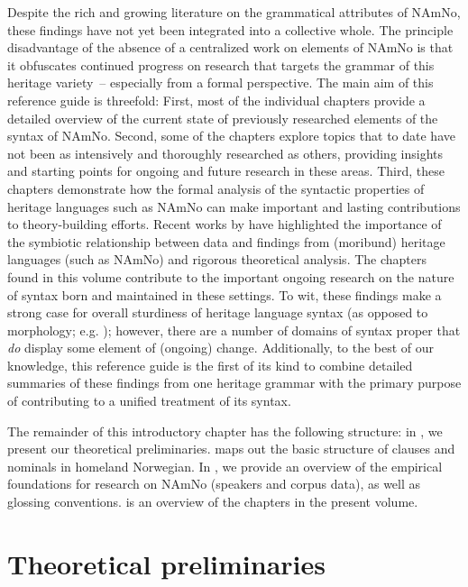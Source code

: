 \documentclass[output=paper,colorlinks,citecolor=brown]{langscibook}
\begin{document}
\begin{sloppypar}
Despite the rich and growing literature on the grammatical attributes of NAmNo, these findings have not yet been integrated into a collective whole. The principle disadvantage of the absence of a centralized work on elements of NAmNo is that it obfuscates continued progress on research that targets the grammar of this heritage variety~-- especially from a formal perspective. The main aim of this reference guide is threefold: First, most of the individual chapters provide a detailed overview of the current state of previously researched elements of the syntax of NAmNo. Second, some of the chapters explore topics that to date have not been as intensively and thoroughly researched as others, providing insights and starting points for ongoing and future research in these areas. Third, these chapters demonstrate how the formal analysis of the syntactic properties of heritage languages such as NAmNo can make important and lasting contributions to theory\hyp building efforts. Recent works by \citet{robertaetal21, robertamike23} have highlighted the importance of the symbiotic relationship between data and findings from (moribund) heritage languages (such as NAmNo) and rigorous theoretical analysis. The chapters found in this volume contribute to the important ongoing research on the nature of syntax born and maintained in these settings. To wit, these findings make a strong case for overall sturdiness of heritage language syntax \citep{lohndal2021} (as opposed to morphology; e.g. \citealt{putnametal2021}); however, there are a number of domains of syntax proper that \textit{do} display some element of (ongoing) change. Additionally, to the best of our knowledge, this reference guide is the first of its kind to combine detailed summaries of these findings from one heritage grammar with the primary purpose of contributing to a unified treatment of its syntax.

The remainder of this introductory chapter has the following structure: in , we present our theoretical preliminaries.  maps out the basic structure of clauses and nominals in homeland Norwegian. In , we provide an overview of the empirical foundations for research on NAmNo (speakers and corpus data), as well as glossing conventions.  is an overview of the chapters in the present volume.  
\end{sloppypar}


\section{Theoretical preliminaries} \label{theory}
\end{document}
